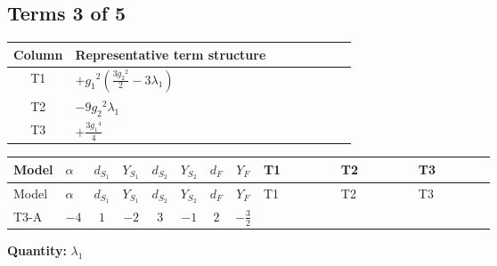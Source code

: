 \documentclass[8pt]{article}
\begin{document}
\begin{landscape}
\subsection*{Terms 3 of 5}
\begin{center}
\begin{tabular}{@{}c >{\raggedright\arraybackslash}p{0.82\linewidth}@{}}
\toprule
Column & Representative term structure \\
\midrule
T1 & \(\displaystyle +{g_1}^2 \left(\frac{3 {g_2}^2}{2}-3 {\lambda_1}\right)\) \\
\midrule
T2 & \(\displaystyle -9 {g_2}^2 {\lambda_1}\) \\
\midrule
T3 & \(\displaystyle +\frac{3 {g_1}^4}{4}\) \\
\midrule
\bottomrule
\end{tabular}
\end{center}
\smallskip
\tiny
\begin{longtable}{@{}llcccccc >{\raggedright\arraybackslash}p{0.21\linewidth} >{\raggedright\arraybackslash}p{0.21\linewidth} >{\raggedright\arraybackslash}p{0.21\linewidth}@{}}
\toprule
Model & $\alpha$ & $d_{S_1}$ & $Y_{S_1}$ & $d_{S_2}$ & $Y_{S_2}$ & $d_F$ & $Y_F$ & T1 & T2 & T3 \\
\midrule
\endfirsthead
\toprule
Model & $\alpha$ & $d_{S_1}$ & $Y_{S_1}$ & $d_{S_2}$ & $Y_{S_2}$ & $d_F$ & $Y_F$ & T1 & T2 & T3 \\
\midrule
\endhead
T3-A & $-4$ & $1$ & $-2$ & $3$ & $-1$ & $2$ & $-\frac{3}{2}$ & \scriptsize\adjustbox{max width=\linewidth}{$\begin{gathered} +{g_1}^2 \left(\frac{3 {g_2}^2}{2}-3 {\lambda_1}\right)\end{gathered}$} & \scriptsize\adjustbox{max width=\linewidth}{$\begin{gathered} -9 {g_2}^2 {\lambda_1}\end{gathered}$} & \scriptsize\adjustbox{max width=\linewidth}{$\begin{gathered} +\frac{3 {g_1}^4}{4}\end{gathered}$} \\
\midrule
\bottomrule
\end{longtable}
\clearpage
\noindent\textbf{Quantity: }$\lambda_1$\par\smallskip

\end{landscape}
\end{document}
